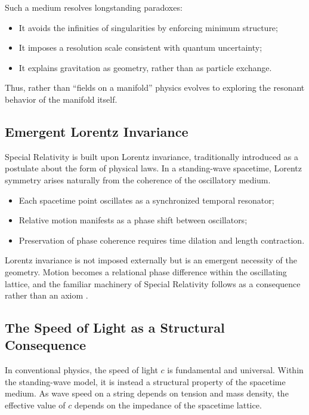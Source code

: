 \documentclass[12pt]{article}
\begin{document}
Such a medium resolves longstanding paradoxes:

\begin{itemize}
  \item It avoids the infinities of singularities by enforcing minimum structure;
  \item It imposes a resolution scale consistent with quantum uncertainty;
  \item It explains gravitation as geometry, rather than as particle exchange.
\end{itemize}

Thus, rather than “fields on a manifold” physics evolves to exploring the resonant behavior of the manifold itself.

\subsection{Emergent Lorentz Invariance}

Special Relativity is built upon Lorentz invariance, traditionally introduced as a postulate about the form of physical laws. In a standing-wave spacetime, Lorentz symmetry arises naturally from the coherence of the oscillatory medium.

\begin{itemize}
  \item Each spacetime point oscillates as a synchronized temporal resonator;
  \item Relative motion manifests as a phase shift between oscillators;
  \item Preservation of phase coherence requires time dilation and length contraction.
\end{itemize}

Lorentz invariance is not imposed externally but is an emergent necessity of the geometry. Motion becomes a relational phase difference within the oscillating lattice, and the familiar machinery of Special Relativity follows as a consequence rather than an axiom \cite{einstein1905}.

\subsection{The Speed of Light as a Structural Consequence}

In conventional physics, the speed of light \( c \) is fundamental and universal. Within the standing-wave model, it is instead a structural property of the spacetime medium. As wave speed on a string depends on tension and mass density, the effective value of \( c \) depends on the impedance of the spacetime lattice.
\end{document}
